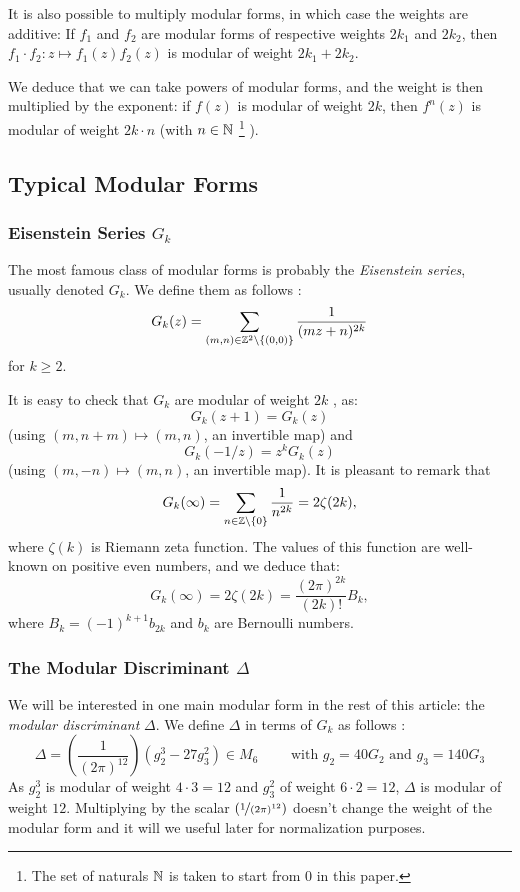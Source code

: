 It is also possible to multiply modular forms, in which case the weights are additive:
If $f_1$ and $f_2$ are modular forms of respective weights $2k_1$ and $2k_2$, then $f_1 \cdot f_2:z \mapsto f_1(z)f_2(z)$ is modular of weight $2k_1+2k_2$.

We deduce that we can take powers of modular forms, and the weight is then multiplied by the exponent:
if $f(z)$ is modular of weight $2k$, then $f^n(z)$ is modular of weight $2k \cdot n$ (with $n \in \mathbb{N}$ \footnote{The set of naturals $\mathbb{N}$ is taken to start from $0$ in this paper.} ).



\subsection{Typical Modular Forms}
\subsubsection{Eisenstein Series $G_k$}
The most famous class of modular forms is probably the \textit{Eisenstein series}, usually denoted $G_k$. We define them as follows \cite[Examples of Modular Forms]{ModularFormsComputationalApproach}:
$$
G_k(z) = \sum_{(m,n) \in \mathbb{Z}^2\setminus\{(0,0)\}} \frac{1}{(mz+n)^{2k}}
$$
for $k \geq 2$.

It is easy to check that $G_k$ are modular of weight $2k$ \cite[Proposition 2.1]{ModularFormsComputationalApproach}, as:
$$
G_k(z+1) = G_k(z)
$$
(using $(m,n+m) \mapsto (m,n)$, an invertible map) and
$$
G_k(-1/z) = z^k G_k(z)
$$
(using $(m,-n) \mapsto (m,n)$, an invertible map).
It is pleasant to remark that \cite[Proposition 2.2]{ModularFormsComputationalApproach}
$$
G_k(\infty) = \sum_{n \in \mathbb{Z} \setminus \{0\} } \frac{1}{n^{2k}} = 2\zeta(2k),
$$ where $\zeta(k)$ is Riemann zeta function.
The values of this function are well-known on positive even numbers, and we deduce \cite[p.194]{MathHandbook} that:
$$
G_k(\infty) = 2\zeta(2k) = \frac{(2\pi)^{2k}}{(2k)!}B_k,
$$
where $B_k = (-1)^{k+1} b_{2k}$ and $b_k$ are Bernoulli numbers.

\subsubsection{The Modular Discriminant $\Delta$}
We will be interested in one main modular form in the rest of this article: the \textit{modular discriminant} $\Delta$.
We define $\Delta$ in terms of $G_k$ as follows \cite[p.84]{CourseInArithmetic}:
$$
\Delta = \left( \frac{1}{(2\pi)^{12}} \right) (g_2^3 - 27g_3^2) \in M_6 \qquad \text{ with } g_2 = 40G_2 \text{ and } g_3 = 140G_3
$$
As $g_2^3$ is modular of weight $4 \cdot 3=12$ and $g_3^2$ of weight $6 \cdot 2 = 12$, $\Delta$ is modular of weight $12$.
Multiplying by the scalar $\left( \nicefrac{1}{(2\pi)^{12}} \right)$ doesn't change the weight of the modular form and it will we useful later for normalization purposes.

